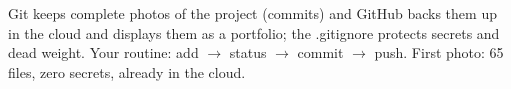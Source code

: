 \documentclass[11pt,a4paper]{article}
\begin{document}
\begin{resumen}
Git keeps complete photos of the project (commits) and GitHub backs them up in the cloud and
displays them as a portfolio; the .gitignore protects secrets and dead weight. Your routine:
add $\rightarrow$ status $\rightarrow$ commit $\rightarrow$ push. First photo: 65 files, zero
secrets, already in the cloud.
\end{resumen}
\end{document}
